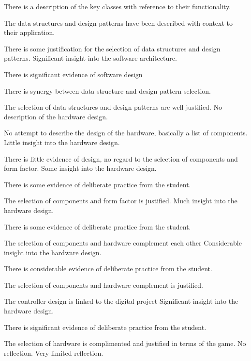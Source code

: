 \documentclass{../../fal_assignment}
\begin{document}
\begin{markingrubric}
	\par There is a description of the key classes with reference to their functionality.
	\par The data structures and design patterns have been described with context to their application.
	\par There is some justification for the selection of data structures and design patterns.
	\grade Significant insight into the software architecture.
	\par There is significant evidence of software design
	\par There is synergy between data structure and design pattern selection.
	\par The selection of data structures and design patterns are well justified.
	\grade\fail No description of the hardware design.
	\par No attempt to describe the design of the hardware, basically a list of components.
	\grade Little insight into the hardware design.
	\par There is little evidence of design, no regard to the selection of components and form factor.
	\grade Some insight into the hardware design.
	\par There is some evidence of deliberate practice from the student.
	\par The selection of components and form factor is justified.
	\grade Much insight into the hardware design.
	\par There is some evidence of deliberate practice from the student.
	\par The selection of components and hardware complement each other
	\grade Considerable insight into the hardware design.
	\par There is considerable evidence of deliberate practice from the student.
	\par The selection of components and hardware complement is justified.
	\par The controller design is linked to the digital project
	\grade Significant insight into the hardware design.
	\par There is significant evidence of deliberate practice from the student.
	\par The selection of hardware is complimented and justified in terms of the game.
	\grade\fail 	No reflection.
	\grade 		Very limited reflection.

\end{markingrubric}
\end{document}
